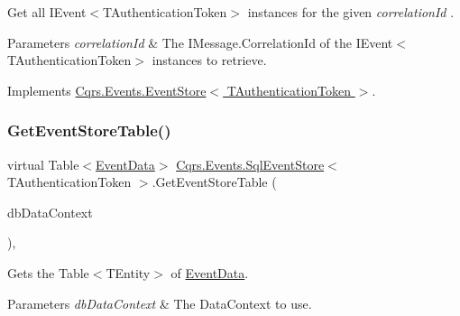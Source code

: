 Get all I\+Event$<$\+T\+Authentication\+Token$>$ instances for the given {\itshape correlation\+Id} . 


\begin{DoxyParams}{Parameters}
{\em correlation\+Id} & The I\+Message.\+Correlation\+Id of the I\+Event$<$\+T\+Authentication\+Token$>$ instances to retrieve.\\
\hline
\end{DoxyParams}


Implements \hyperlink{classCqrs_1_1Events_1_1EventStore_a0096646f5dff730b0041b9469719c420_a0096646f5dff730b0041b9469719c420}{Cqrs.\+Events.\+Event\+Store$<$ T\+Authentication\+Token $>$}.

\mbox{\label{classCqrs_1_1Events_1_1SqlEventStore_a6daa6c32874ab593d0d8a54c90d219c6_a6daa6c32874ab593d0d8a54c90d219c6}} 
\subsubsection{\texorpdfstring{Get\+Event\+Store\+Table()}{GetEventStoreTable()}}
{\footnotesize\ttfamily virtual Table$<$\hyperlink{classCqrs_1_1Events_1_1EventData}{Event\+Data}$>$ \hyperlink{classCqrs_1_1Events_1_1SqlEventStore}{Cqrs.\+Events.\+Sql\+Event\+Store}$<$ T\+Authentication\+Token $>$.Get\+Event\+Store\+Table (\begin{DoxyParamCaption}\item[{Data\+Context}]{db\+Data\+Context }\end{DoxyParamCaption})\hspace{0.3cm}{\ttfamily [protected]}, {\ttfamily [virtual]}}



Gets the Table$<$\+T\+Entity$>$ of \hyperlink{classCqrs_1_1Events_1_1EventData}{Event\+Data}. 


\begin{DoxyParams}{Parameters}
{\em db\+Data\+Context} & The Data\+Context to use.\\
\hline
\end{DoxyParams}
\mbox{\label{classCqrs_1_1Events_1_1SqlEventStore_a8d67570d50a97050cbce5a29d7a4b9f6_a8d67570d50a97050cbce5a29d7a4b9f6}} 
